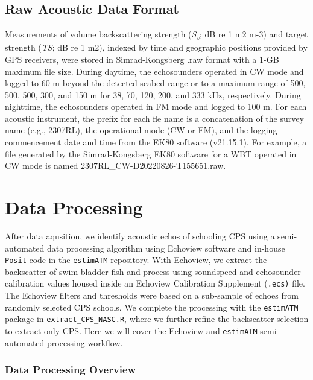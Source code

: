 \documentclass[
  letterpaper,
  oneside,
  open=any]{scrbook}
\begin{document}
\section{Raw Acoustic Data Format}\label{raw-acoustic-data-format}

Measurements of volume backscattering strength
(\emph{S\textsubscript{v}}; dB re 1 m2 m-3) and target strength
(\emph{TS}; dB re 1 m2), indexed by time and geographic positions
provided by GPS receivers, were stored in Simrad-Kongsberg .raw format
with a 1-GB maximum file size. During daytime, the echosounders operated
in CW mode and logged to 60 m beyond the detected seabed range or to a
maximum range of 500, 500, 500, 300, and 150 m for 38, 70, 120, 200, and
333 kHz, respectively. During nighttime, the echosounders operated in FM
mode and logged to 100 m. For each acoustic instrument, the prefix for
each fle name is a concatenation of the survey name (e.g., 2307RL), the
operational mode (CW or FM), and the logging commencement date and time
from the EK80 software (v21.15.1). For example, a file generated by the
Simrad-Kongsberg EK80 software for a WBT operated in CW mode is named
2307RL\_CW-D20220826-T155651.raw.


\chapter{Data Processing}\label{data-processing}

After data aqusition, we identify acoustic echos of schooling CPS using
a semi-automated data processing algorithm using Echoview software and
in-house \texttt{Posit} code in the \texttt{estimATM}
\href{https://github.com/kstierhoff/estimATM}{repository}. With
Echoview, we extract the backscatter of swim bladder fish and process
using soundspeed and echosounder calibration values housed inside an
Echoview Calibration Supplement (\texttt{.ecs)} file. The Echoview
filters and thresholds were based on a sub-sample of echoes from
randomly selected CPS schools. We complete the processing with the
\texttt{estimATM} package in \texttt{extract\_CPS\_NASC.R}, where we
further refine the backscatter selection to extract only CPS. Here we
will cover the Echoview and \texttt{estimATM} semi-automated processing
workflow.

\subsection{Data Processing Overview}\label{data-processing-overview}
\end{document}
